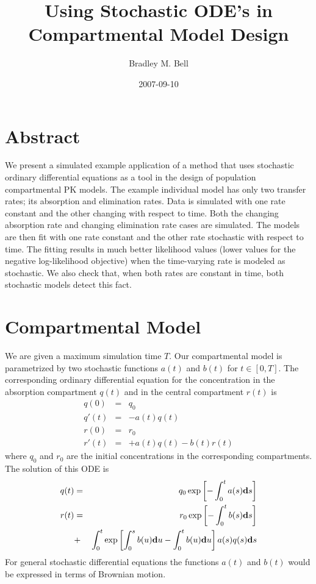 \documentclass{article}
\title{Using Stochastic ODE's in Compartmental Model Design}
\author{Bradley M. Bell}
\date{2007-09-10}
\newcommand{\B}[1]{{\bf #1}}
\begin{document}
\maketitle

\section{Abstract}
We present a simulated example application of a method 
that uses stochastic ordinary differential equations 
as a tool in the design of population compartmental PK models.
The example individual model has only two transfer rates;
its absorption and elimination rates.
Data is simulated with one rate constant
and the other changing with respect to time.
Both the changing absorption rate
and changing elimination rate cases are simulated.
The models are then fit with one rate constant and the 
other rate stochastic with respect to time.
The fitting results in much better likelihood values
(lower values for the negative log-likelihood objective)
when the time-varying rate is modeled as stochastic.
We also check that, when both rates are constant in time,
both stochastic models detect this fact.

\section{Compartmental Model}
We are given a maximum simulation time \( T \).
Our compartmental model 
is parametrized by two stochastic functions
\( a (t) \) and \( b (t) \) for \( t \in [0, T] \).
The corresponding ordinary differential equation for the
concentration in the absorption compartment \( q(t) \)
and in the central compartment \( r(t) \) is
\begin{eqnarray*}
q (0)  & = & q_0
\\
q' (t) & = & - a(t) q(t)
\\
r (0) & = & r_0
\\
r' (t) & = & + a(t) q(t) - b(t) r(t)
\end{eqnarray*}
where \( q_0 \) and \( r_0 \) are the initial concentrations
in the corresponding compartments.
The solution of this ODE is
\begin{eqnarray*}
q ( t ) 
& = & 
q_0 \exp \left[ - \int_0^t a(s) \B{d} s \right]
\\
r ( t ) 
& = & 
r_0 \exp \left[ - \int_0^t b(s) \B{d} s \right]
\\
& + & 
\int_0^t \exp \left[ 
	\int_0^s b(u) \B{d} u - \int_0^t  b(u) \B{d} u 
\right] a(s) q(s) \B{d} s
\end{eqnarray*}
For general stochastic differential equations the functions
\( a(t) \) and \( b(t) \) would be expressed in terms of 
Brownian motion.
\end{document}
